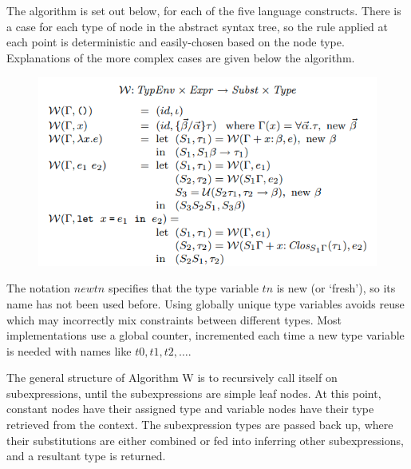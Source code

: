 \documentclass[a4paper,fleqn,twoside,12pt]{report}
\begin{document}
The algorithm is set out below, for each of the five language constructs. There is a case for each type of node in the abstract syntax tree, so the rule applied at each point is deterministic and easily-chosen based on the node type. Explanations of the more complex cases are given below the algorithm.

\begin{figure}[h!]
  \centering
  \includegraphics[width=0.987\linewidth]{images/image4.png}
\end{figure}


The notation $new tn$ specifies that the type variable $tn$ is new (or ‘fresh’), so its name has not been used before. Using globally unique type variables avoids reuse which may incorrectly mix constraints between different types. Most implementations use a global counter, incremented each time a new type variable is needed with names like $t0, t1, t2, \dots$.

The general structure of Algorithm W is to recursively call itself on subexpressions, until the subexpressions are simple leaf nodes. At this point, constant nodes have their assigned type and variable nodes have their type retrieved from the context. The subexpression types are passed back up, where their substitutions are either combined or fed into inferring other subexpressions, and a resultant type is returned.
\end{document}
